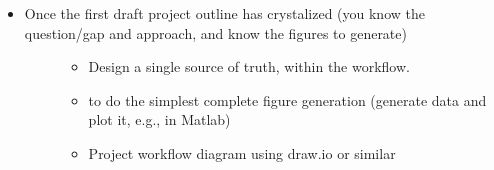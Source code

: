 \documentclass[letterpaper,10pt,english]{sphinxmanual}
\begin{document}
\begin{itemize}
\begin{description}
\begin{itemize}
\item {} 
\sphinxAtStartPar
Thoughtful tree (i.e., folder and subfolder) structure. There are  written on whether to put source in a  directory.

\item {} 
\sphinxhyphen{}20\% of time “refactoring” (improving the code even if it’s working fine as is). An expression from software engineering is “technical debt”, the amount of disorganized clutter that slows future progress. How much time should you spend paying down technical debt (re\sphinxhyphen{}organizing your notes and directory structure, taking notes) versus producing results? This is called “refactoring”. We debated this percent a lot and this is the range that emerged.

\end{itemize}

\end{description}

\item {} \begin{description}
\item[{Once the first draft project outline has crystalized (you know the question/gap and approach, and know the figures to generate)}] \leavevmode\begin{itemize}
\item {} 
\sphinxAtStartPar
Design a single source of truth, within the workflow.

\item {} 
\sphinxAtStartPar
{} to do the simplest complete figure generation (generate data and plot it, e.g., in Matlab)

\item {} 
\sphinxAtStartPar
Project workflow diagram using draw.io or similar

\end{itemize}

\end{description}

\end{itemize}
\end{document}
